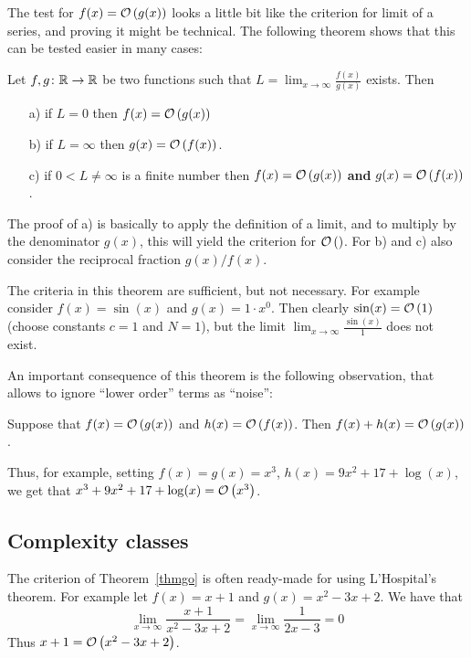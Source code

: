 The test for $f(x)={\mathcal O}\/\left(g(x)\right)$ looks a little bit like the criterion for
limit of a series, and proving it might be technical. The following theorem
shows that this can be tested easier in many cases:
\begin{thm}
\label{thmgo}
Let $f,g\colon{\mathbb R}\to{\mathbb R}$ be two functions such that 
$L=\displaystyle \lim_{x\to\infty}\frac{f(x)}{g(x)}$ exists. Then
\begin{itemize}
\item[a)] if $L=0$ then $f(x)={\mathcal O}\/\left(g(x)\right)$
\item[b)] if $L=\infty$ then $g(x)={\mathcal O}\/\left(f(x)\right)$.
\item[c)] if $0<L\not=\infty$ is a finite number then 
$f(x)={\mathcal O}\/\left(g(x)\right)$ \textbf{and} $g(x)={\mathcal O}\/\left(f(x)\right)$.
\end{itemize}
\end{thm}
The proof of a) is basically to apply the definition of a limit, and to multiply
by the denominator $g(x)$, this will yield the criterion for ${\mathcal O}\/\left(\right)$. For
b) and c) also consider the reciprocal fraction $g(x)/f(x)$.
\begin{note}
The criteria in this theorem are sufficient, but not necessary. For example
consider $f(x)=\sin(x)$ and $g(x)=1\cdot x^0$. Then clearly
$\sin(x)={\mathcal O}\/\left(1\right)$ (choose constants $c=1$ and $N=1$), but the limit
$\displaystyle \lim_{x\to\infty}\frac{\sin(x)}{1}$ does not exist.
\end{note}

An important consequence of this theorem is the following observation, that
allows to ignore ``lower order'' terms as ``noise'':

Suppose that $f(x)={\mathcal O}\/\left(g(x)\right)$ and $h(x)={\mathcal O}\/\left(f(x)\right)$. Then
$f(x)+h(x)={\mathcal O}\/\left(g(x)\right)$.

Thus, for example, setting $f(x)=g(x)=x^3$, $h(x)=9x^2+17+\log(x)$,
we get that $x^3+9x^2+17+\log(x)={\mathcal O}\/\left(x^3\right)$.

\subsection{Complexity classes}
The criterion of Theorem~\ref{thmgo} is often ready-made for using
L'Hospital's theorem. For example let $f(x)=x+1$ and $g(x)=x^2-3x+2$.
We have that
\[
\lim_{x\to\infty}\frac{x+1}{x^2-3x+2}
=\lim_{x\to\infty}\frac{1}{2x-3}=0
\]
Thus $x+1={\mathcal O}\/\left(x^2-3x+2\right)$.

